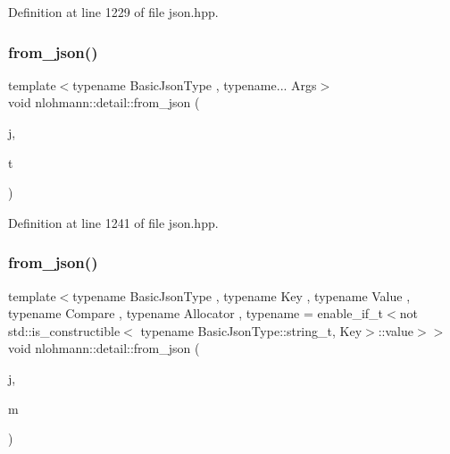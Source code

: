 Definition at line 1229 of file json.\+hpp.

\mbox{\label{namespacenlohmann_1_1detail_a8b99ec9b29f3f20a18fc4281fb784e49}} 
\subsubsection{\texorpdfstring{from\+\_\+json()}{from\_json()}\hspace{0.1cm}{\footnotesize\ttfamily [16/18]}}
{\footnotesize\ttfamily template$<$typename Basic\+Json\+Type , typename... Args$>$ \\
void nlohmann\+::detail\+::from\+\_\+json (\begin{DoxyParamCaption}\item[{const Basic\+Json\+Type \&}]{j,  }\item[{std\+::tuple$<$ Args... $>$ \&}]{t }\end{DoxyParamCaption})}



Definition at line 1241 of file json.\+hpp.

\mbox{\label{namespacenlohmann_1_1detail_ae93147a54d2740228ef16a5e6210ca3e}} 
\subsubsection{\texorpdfstring{from\+\_\+json()}{from\_json()}\hspace{0.1cm}{\footnotesize\ttfamily [17/18]}}
{\footnotesize\ttfamily template$<$typename Basic\+Json\+Type , typename Key , typename Value , typename Compare , typename Allocator , typename  = enable\+\_\+if\+\_\+t$<$not std\+::is\+\_\+constructible$<$                                     typename Basic\+Json\+Type\+::string\+\_\+t, Key$>$\+::value$>$$>$ \\
void nlohmann\+::detail\+::from\+\_\+json (\begin{DoxyParamCaption}\item[{const Basic\+Json\+Type \&}]{j,  }\item[{std\+::map$<$ Key, Value, Compare, Allocator $>$ \&}]{m }\end{DoxyParamCaption})}



